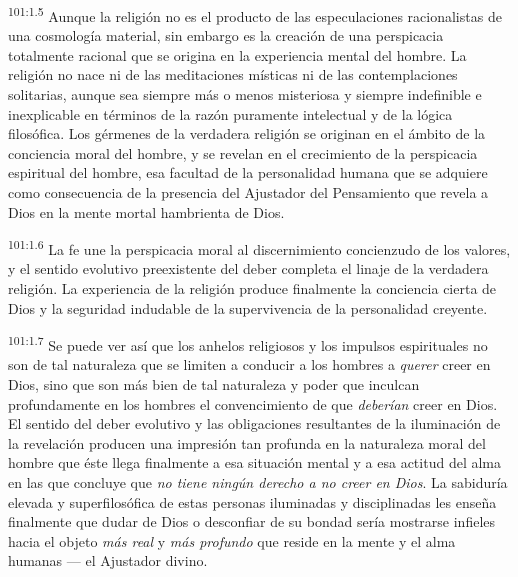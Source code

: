 \documentclass[twoside, 11pt]{book}
\begin{document}
\par
\textsuperscript{101:1.5} Aunque la religión no es el producto de las especulaciones racionalistas de una cosmología material, sin embargo es la creación de una perspicacia totalmente racional que se origina en la experiencia mental del hombre. La religión no nace ni de las meditaciones místicas ni de las contemplaciones solitarias, aunque sea siempre más o menos misteriosa y siempre indefinible e inexplicable en términos de la razón puramente intelectual y de la lógica filosófica. Los gérmenes de la verdadera religión se originan en el ámbito de la conciencia moral del hombre, y se revelan en el crecimiento de la perspicacia espiritual del hombre, esa facultad de la personalidad humana que se adquiere como consecuencia de la presencia del Ajustador del Pensamiento que revela a Dios en la mente mortal hambrienta de Dios.

\par
\textsuperscript{101:1.6} La fe une la perspicacia moral al discernimiento concienzudo de los valores, y el sentido evolutivo preexistente del deber completa el linaje de la verdadera religión. La experiencia de la religión produce finalmente la conciencia cierta de Dios y la seguridad indudable de la supervivencia de la personalidad creyente.

\par
\textsuperscript{101:1.7} Se puede ver así que los anhelos religiosos y los impulsos espirituales no son de tal naturaleza que se limiten a conducir a los hombres a \textit{querer} creer en Dios, sino que son más bien de tal naturaleza y poder que inculcan profundamente en los hombres el convencimiento de que \textit{deberían} creer en Dios. El sentido del deber evolutivo y las obligaciones resultantes de la iluminación de la revelación producen una impresión tan profunda en la naturaleza moral del hombre que éste llega finalmente a esa situación mental y a esa actitud del alma en las que concluye que \textit{no tiene ningún derecho a no creer en Dios}. La sabiduría elevada y superfilosófica de estas personas iluminadas y disciplinadas les enseña finalmente que dudar de Dios o desconfiar de su bondad sería mostrarse infieles hacia el objeto \textit{más real} y \textit{más profundo} que reside en la mente y el alma humanas --- el Ajustador divino.
\end{document}
